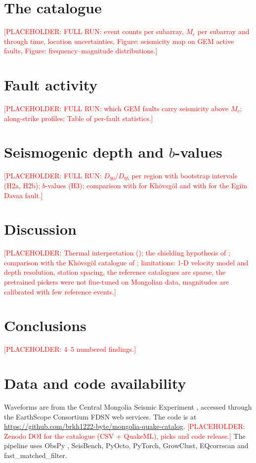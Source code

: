 \documentclass[11pt]{article}
\newcommand{\placeholder}[1]{\textcolor{red}{[PLACEHOLDER: #1]}}
\begin{document}
\section{The catalogue}
\placeholder{FULL RUN: event counts per subarray, $M_c$ per subarray and through time, location uncertainties, Figure: seismicity map on GEM active faults, Figure: frequency--magnitude distributions.}

\section{Fault activity}
\placeholder{FULL RUN: which GEM faults carry seismicity above $M_c$; along-strike profiles; Table of per-fault statistics.}

\section{Seismogenic depth and $b$-values}
\placeholder{FULL RUN: $D_{90}$/$D_{95}$ per region with bootstrap intervals (H2a, H2b); $b$-values (H3); comparison with \citet{emanov2026} for Khövsgöl and with \citet{dashdondog2026} for the Egiin Davaa fault.}

\section{Discussion}
\placeholder{Thermal interpretation (\citealp{comeau2018,feng2021}); the shielding hypothesis of \citet{huang2022}; comparison with the Khövsgöl catalogue of \citet{emanov2025}; limitations: 1-D velocity model and depth resolution, station spacing, the reference catalogues are sparse, the pretrained pickers were not fine-tuned on Mongolian data, magnitudes are calibrated with few reference events.}

\section{Conclusions}
\placeholder{4--5 numbered findings.}

\section*{Data and code availability}
Waveforms are from the Central Mongolia Seismic Experiment \citep[network XL, doi:10.7914/SN/XL\_2012;][]{xl_dataset}, accessed through the EarthScope Consortium FDSN web services. The code is at \url{https://github.com/brkh1222-byte/mongolia-quake-catalog}. \placeholder{Zenodo DOI for the catalogue (CSV + QuakeML), picks and code release.} The pipeline uses ObsPy \citep{beyreuther2010,krischer2015}, SeisBench, PyOcto, PyTorch, GrowClust, EQcorrscan and fast\_matched\_filter.
\end{document}
